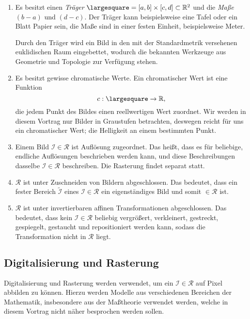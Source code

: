 \documentclass[afourpaper]{tufte-handout}
\begin{document}
\begin{enumerate}
  \item Es besitzt einen \emph{Träger} \( \largesquare = [a,b] \times [c,d] \subset \R^2 \) und die \emph{Maße} \( (b-a) \) und \( (d-c) \). Der Träger kann beispielsweise eine Tafel oder ein Blatt Papier sein, die Maße sind in einer festen Einheit, beispielsweise Meter.

  Durch den Träger wird ein Bild in den mit der Standardmetrik versehenen euklidischen Raum eingebettet, wodurch die bekannten Werkzeuge aus Geometrie und Topologie zur Verfügung stehen.

  \item Es besitzt gewisse chromatische Werte. Ein chromatischer Wert ist eine Funktion
  \begin{equation*}
    c: \largesquare \to \R\text{,}
  \end{equation*}
  die jedem Punkt des Bildes einen reellwertigen Wert zuordnet. Wir werden in diesem Vortrag nur Bilder in Graustufen betrachten, deswegen reicht für uns ein chromatischer Wert; die Helligkeit an einem bestimmten Punkt.

  \item Einem Bild \( \mathcal{I} \in \mathcal{R} \) ist  Auflösung zugeordnet. Das heißt, dass es für beliebige, endliche Auflösungen beschrieben werden kann, und diese Beschreibungen dasselbe \( \mathcal{I} \in \mathcal{R} \) beschreiben. Die Rasterung findet separat statt.

  \item \( \mathcal{R} \) ist unter Zuschneiden von Bildern abgeschlossen. Das bedeutet, dass ein fester Bereich \( \widetilde{\mathcal{I}} \) eines \( \mathcal{I} \in \mathcal{R} \) ein eigenständiges Bild und somit \( \in \mathcal{R} \) ist.

  \item \( \mathcal{R} \) ist unter invertierbaren affinen Transformationen abgeschlossen. Das bedeutet, dass kein \( \mathcal{I} \in \mathcal{R} \) beliebig vergrößert, verkleinert, gestreckt, gespiegelt, gestaucht und repositioniert werden kann, sodass die Transformation nicht in \( \mathcal{R} \) liegt.
\end{enumerate}

\subsection{Digitalisierung und Rasterung}

Digitalisierung und Rasterung werden verwendet, um ein \( \mathcal{I} \in \mathcal{R} \) auf Pixel abbilden zu können. Hierzu werden Modelle aus verschiedenen Bereichen der Mathematik, insbesondere aus der Maßtheorie verwendet werden, welche in diesem Vortrag nicht näher besprochen werden sollen.
\end{document}
